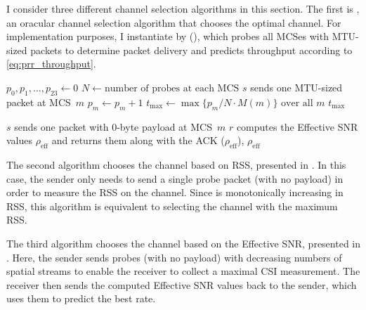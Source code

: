 I consider three different channel selection algorithms in this section. The first is , an oracular channel selection algorithm that chooses the optimal channel. For implementation purposes, I instantiate  by  (), which probes all MCSes with MTU-sized packets to determine packet delivery and predicts throughput according to \eqref{eq:prr_throughput}.

\begin{algorithm}[tp]
\caption{\label{alg:chan_sel_probe}}
\begin{algorithmic}
\STATE $p_0,p_1,\dots,p_{23} \gets 0$
\STATE $N \gets \text{number of probes at each MCS}$
\STATE $s$ sends one MTU-sized packet at MCS~$m$
\STATE $p_m \gets p_m + 1$
\ENDIF
\ENDFOR
\ENDFOR
\STATE $t_{\max}\gets \max \{p_m/N \cdot M(m)\} \text{ over all } m$ \hfill \COMMENT{\eqref{eq:prr_throughput}}
\RETURN $t_{\max}$
\end{algorithmic}
\end{algorithm}
\begin{algorithm}[tp]
\caption{\label{alg:chan_sel_esnr}}
\begin{algorithmic}
\STATE $s$ sends one packet with 0-byte payload at MCS~$m$
\STATE $r$ computes the Effective SNR values $\rho_\text{eff}$ and returns them along with the ACK
	\RETURN {}($\rho_\text{eff}$), $\rho_\text{eff}$ \hfill {}
\ENDIF
\ENDFOR
{}
\end{algorithmic}
\end{algorithm}

The second algorithm chooses the channel based on RSS, presented in . In this case, the sender only needs to send a single probe packet (with no payload) in order to measure the RSS on the channel. Since  is monotonically increasing in RSS, this algorithm is equivalent to selecting the channel with the maximum RSS\@.

The third algorithm chooses the channel based on the Effective SNR, presented in . Here, the sender sends probes (with no payload) with decreasing numbers of spatial streams to enable the receiver to collect a maximal CSI measurement. The receiver then sends the computed Effective SNR values back to the sender, which uses them to predict the best rate.

